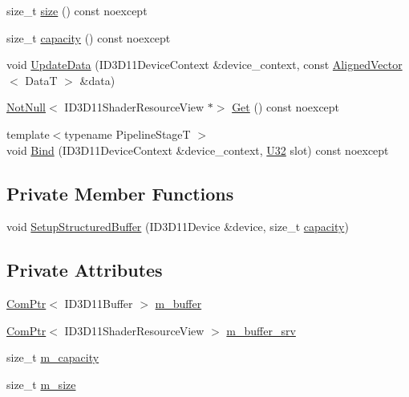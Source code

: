 \begin{DoxyCompactItemize}
size\+\_\+t \hyperlink{classmage_1_1rendering_1_1_structured_buffer_ac51ac06740ae72d54a88d5d1b2f1a05d}{size} () const noexcept
\item 
size\+\_\+t \hyperlink{classmage_1_1rendering_1_1_structured_buffer_acbcdaebd04869e0248b8394c4823c433}{capacity} () const noexcept
\item 
void \hyperlink{classmage_1_1rendering_1_1_structured_buffer_af9d973d62ceefdcd7189c3b860f25b75}{Update\+Data} (I\+D3\+D11\+Device\+Context \&device\+\_\+context, const \hyperlink{namespacemage_a8664bfb5ce2179fc64eae9f82c8a5ba8}{Aligned\+Vector}$<$ DataT $>$ \&data)
\item 
\hyperlink{namespacemage_a8769f9d670d6b585ea306cb1062af94b}{Not\+Null}$<$ I\+D3\+D11\+Shader\+Resource\+View $\ast$$>$ \hyperlink{classmage_1_1rendering_1_1_structured_buffer_a7a2203f9542ac15f0053053d694d906c}{Get} () const noexcept
\item 
{\footnotesize template$<$typename Pipeline\+StageT $>$ }\\void \hyperlink{classmage_1_1rendering_1_1_structured_buffer_a46851d2fd8cb5efeda451bb90eaafb7a}{Bind} (I\+D3\+D11\+Device\+Context \&device\+\_\+context, \hyperlink{namespacemage_a41c104c036fba3756a74e19f793eeaa1}{U32} slot) const noexcept
\end{DoxyCompactItemize}
\subsection*{Private Member Functions}
\begin{DoxyCompactItemize}
\item 
void \hyperlink{classmage_1_1rendering_1_1_structured_buffer_aa8777c23aa6135e2d75a786df3937807}{Setup\+Structured\+Buffer} (I\+D3\+D11\+Device \&device, size\+\_\+t \hyperlink{classmage_1_1rendering_1_1_structured_buffer_acbcdaebd04869e0248b8394c4823c433}{capacity})
\end{DoxyCompactItemize}
\subsection*{Private Attributes}
\begin{DoxyCompactItemize}
\item 
\hyperlink{namespacemage_ae74f374780900893caa5555d1031fd79}{Com\+Ptr}$<$ I\+D3\+D11\+Buffer $>$ \hyperlink{classmage_1_1rendering_1_1_structured_buffer_a9bc484869ba3102e1e392438a2f3adeb}{m\+\_\+buffer}
\item 
\hyperlink{namespacemage_ae74f374780900893caa5555d1031fd79}{Com\+Ptr}$<$ I\+D3\+D11\+Shader\+Resource\+View $>$ \hyperlink{classmage_1_1rendering_1_1_structured_buffer_a07e3cc7dab6b293b084afb6b1fa8b035}{m\+\_\+buffer\+\_\+srv}
\item 
size\+\_\+t \hyperlink{classmage_1_1rendering_1_1_structured_buffer_a0251edd40d14732396952db2c0970fbf}{m\+\_\+capacity}
\item 
size\+\_\+t \hyperlink{classmage_1_1rendering_1_1_structured_buffer_a6985fe51dee8a1539994230f062a21ef}{m\+\_\+size}
\end{DoxyCompactItemize}


